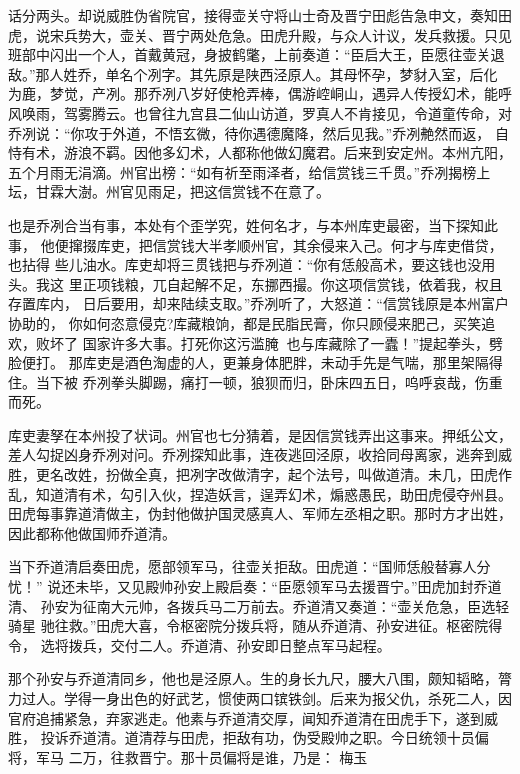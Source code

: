 话分两头。却说威胜伪省院官，接得壶关守将山士奇及晋宁田彪告急申文，奏知田
虎，说宋兵势大，壶关、晋宁两处危急。田虎升殿，与众人计议，发兵救援。只见
班部中闪出一个人，首戴黄冠，身披鹤氅，上前奏道：“臣启大王，臣愿往壶关退
敌。”那人姓乔，单名个冽字。其先原是陕西泾原人。其母怀孕，梦豺入室，后化
为鹿，梦觉，产冽。那乔冽八岁好使枪弄棒，偶游崆峒山，遇异人传授幻术，能呼
风唤雨，驾雾腾云。也曾往九宫县二仙山访道，罗真人不肯接见，令道童传命，对
乔冽说：“你攻于外道，不悟玄微，待你遇德魔降，然后见我。”乔冽艴然而返，
自恃有术，游浪不羁。因他多幻术，人都称他做幻魔君。后来到安定州。本州亢阳，
五个月雨无涓滴。州官出榜：“如有祈至雨泽者，给信赏钱三千贯。”乔冽揭榜上
坛，甘霖大澍。州官见雨足，把这信赏钱不在意了。

也是乔冽合当有事，本处有个歪学究，姓何名才，与本州库吏最密，当下探知此事，
他便撺掇库吏，把信赏钱大半孝顺州官，其余侵来入己。何才与库吏借贷，也拈得
些儿油水。库吏却将三贯钱把与乔冽道：“你有恁般高术，要这钱也没用头。我这
里正项钱粮，兀自起解不足，东挪西撮。你这项信赏钱，依着我，权且存置库内，
日后要用，却来陆续支取。”乔冽听了，大怒道：“信赏钱原是本州富户协助的，
你如何恣意侵克?库藏粮饷，都是民脂民膏，你只顾侵来肥己，买笑追欢，败坏了
国家许多大事。打死你这污滥腌，也与库藏除了一蠹！”提起拳头，劈脸便打。
那库吏是酒色淘虚的人，更兼身体肥胖，未动手先是气喘，那里架隔得住。当下被
乔冽拳头脚踢，痛打一顿，狼狈而归，卧床四五日，呜呼哀哉，伤重而死。

库吏妻孥在本州投了状词。州官也七分猜着，是因信赏钱弄出这事来。押纸公文，
差人勾捉凶身乔冽对问。乔冽探知此事，连夜逃回泾原，收拾同母离家，逃奔到威
胜，更名改姓，扮做全真，把冽字改做清字，起个法号，叫做道清。未几，田虎作
乱，知道清有术，勾引入伙，捏造妖言，逞弄幻术，煽惑愚民，助田虎侵夺州县。
田虎每事靠道清做主，伪封他做护国灵感真人、军师左丞相之职。那时方才出姓，
因此都称他做国师乔道清。

当下乔道清启奏田虎，愿部领军马，往壶关拒敌。田虎道：“国师恁般替寡人分忧！”
说还未毕，又见殿帅孙安上殿启奏：“臣愿领军马去援晋宁。”田虎加封乔道清、
孙安为征南大元帅，各拨兵马二万前去。乔道清又奏道：“壶关危急，臣选轻骑星
驰往救。”田虎大喜，令枢密院分拨兵将，随从乔道清、孙安进征。枢密院得令，
选将拨兵，交付二人。乔道清、孙安即日整点军马起程。

那个孙安与乔道清同乡，他也是泾原人。生的身长九尺，腰大八围，颇知韬略，膂
力过人。学得一身出色的好武艺，惯使两口镔铁剑。后来为报父仇，杀死二人，因
官府追捕紧急，弃家逃走。他素与乔道清交厚，闻知乔道清在田虎手下，遂到威胜，
投诉乔道清。道清荐与田虎，拒敌有功，伪受殿帅之职。今日统领十员偏将，军马
二万，往救晋宁。那十员偏将是谁，乃是：
梅玉

